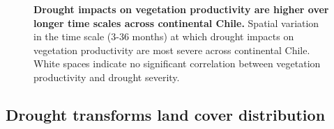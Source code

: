 \documentclass[
  sn-nature,
  numbered]{sn-jnl}
\begin{document}
\begin{figure}[!ht]


\caption{\label{fig-map_selec_time_scales_indices}\textbf{Drought
impacts on vegetation productivity are higher over longer time scales
across continental Chile.} Spatial variation in the time scale (3-36
months) at which drought impacts on vegetation productivity are most
severe across continental Chile. White spaces indicate no significant
correlation between vegetation productivity and drought severity.}

\end{figure}%

\subsection{Drought transforms land cover
distribution}\label{drought-transforms-land-cover-distribution}
\end{document}
